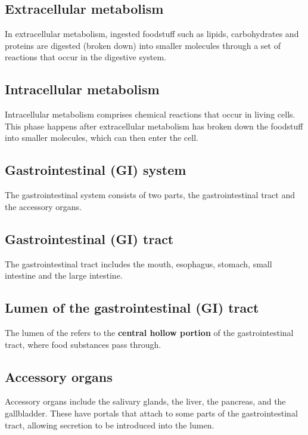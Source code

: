\documentclass[11pt]{article}
\begin{document}
\subsection{Extracellular metabolism}
\label{sec:org3bd2c1d}
In extracellular metabolism, ingested foodstuff such as lipids, carbohydrates and proteins are digested (broken down) into smaller molecules through a set of reactions that occur in the digestive system.

\subsection{Intracellular metabolism}
\label{sec:org94634c1}
Intracellular metabolism comprises chemical reactions that occur in living cells. This phase happens after extracellular metabolism has broken down the foodstuff into smaller molecules, which can then enter the cell.

\subsection{Gastrointestinal (GI) system}
\label{sec:orgf76e20d}
The gastrointestinal system consists of two parts, the gastrointestinal tract and the accessory organs.

\subsection{Gastrointestinal (GI) tract}
\label{sec:org00b6c8c}
The gastrointestinal tract includes the mouth, esophagus, stomach, small intestine and the large intestine.

\subsection{Lumen of the gastrointestinal (GI) tract}
\label{sec:orgc1c8d17}
The lumen of the refers to the \textbf{central hollow portion} of the gastrointestinal tract, where food substances pass through.

\newpage

\subsection{Accessory organs}
\label{sec:org5ea3d8c}
Accessory organs include the salivary glands, the liver, the pancreas, and the gallbladder. These have portals that attach to some parts of the gastrointestinal tract, allowing secretion to be introduced into the lumen.
\\[0pt]
\end{document}
